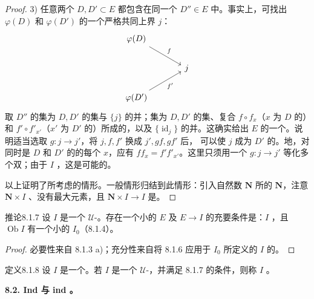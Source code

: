 \begin{proof}
3) 任意两个 $D,D'\subset E$ 都包含在同一个 $D''\in E$ 中。事实上，可找出 $\varphi(D)$ 和 $\varphi(D')$ 的一个严格共同上界 $j$：
\[
\begin{tikzcd}[column sep=large]
\varphi(D)\arrow[dr,"f"]&\\
&j\\
\varphi(D')\arrow[ur,"f'"']&
\end{tikzcd}
\]
取 $D''$ 的集为 $D,D'$ 的集与 $\{j\}$ 的并；集为 $D,D'$ 的集、复合 $f\circ f_x$（$x$ 为 $D$ 的）和 $f'\circ f'_{x'}$（$x'$ 为 $D'$ 的）所成的，以及 $\{\operatorname{id}_j\}$ 的并。这确实给出 $E$ 的一个。说明适当选取 $g:j\to j'$，将 $j,f,f'$ 换成 $j',gf,gf'$ 后，
可以使 $j$ 成为 $D'$ 的。地，对同时是 $D$ 和 $D'$ 的的每个 $x$，应有 $ff_x=f'f'_{x'}$。这里只须用一个 $g:j\to j'$ 等化多个双；由于 $I$ ，这是可能的。

以上证明了所考虑的情形。一般情形归结到此情形：引入自然数 $\mathbf N$ 所的 $\mathbf N$，注意 $\mathbf N\times I$ 、没有最大元素，且 $\mathbf N\times I\to I$ 是。
\end{proof}
\begin{SGAresult}{推论}{8.1.7}
设 $I$ 是一个 $\mathcal U$-。存在一个小的 $E$ 及 $E\to I$ 的充要条件是：$I$ ，且 $\operatorname{Ob}I$ 有一个小的 $I_0$（8.1.4）。
\end{SGAresult}
\begin{proof}
必要性来自 8.1.3 a)；充分性来自将 8.1.6 应用于 $I_0$ 所定义的 $I$ 的。
\end{proof}
\begin{SGAresult}{定义}{8.1.8}
设 $I$ 是一个。若 $I$ 是一个 $\mathcal U$-，并满足 8.1.7 的条件，则称 $I$ 。
\end{SGAresult}

\textbf{8.2. Ind 与 ind 。}

